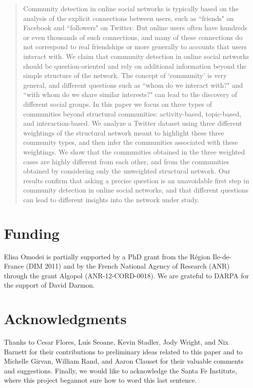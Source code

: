 \documentclass{article}
\newcommand{\alert}[1]{{\color{red}#1}}
\begin{document}
\begin{abstract}


Community detection in online social networks is typically based on the analysis of the explicit connections between users, such as ``friends" on Facebook and ``followers" on Twitter. But online users often have hundreds or even thousands of such connections, and many of these connections do not correspond to real friendships or more generally to accounts that users interact with. We claim that community detection in online social networks should be question-oriented and rely on additional information beyond the simple structure of the network. The concept of `community' is very general, and different questions such as ``whom do we interact with?" and ``with whom do we share similar interests?" can lead to the discovery of different social groups. In this paper we focus on three types of communities beyond structural communities: activity-based, topic-based, and interaction-based. We analyze a Twitter dataset using three different weightings of the structural network meant to highlight these three community types, and then infer the communities associated with these weightings. We show that the communities obtained in the three weighted cases are highly different from each other, and from the communities obtained by considering only the unweighted structural network. Our results confirm that asking a precise question is an unavoidable first step in community detection in online social networks, and that different questions can lead to different insights into the network under study.
\end{abstract}

\newpage






\section{Funding}
Elisa Omodei is partially supported by a PhD grant from the Région Ile-de-France (DIM 2011) and by the French National Agency of Research (ANR) through the grant Algopol (ANR-12-CORD-0018).
We are grateful to DARPA for the support of David Darmon.
\section{Acknowledgments}

Thanks to Cesar Flores, Lu\'is Seoane, Kevin Stadler, Jody Wright, and Nix Barnett for their contributions to preliminary ideas related to this paper and to Michelle Girvan, William Rand, and Aaron Clauset for their valuable comments and suggestions. Finally, we would like to acknowledge the Santa Fe Institute, where this project began\alert{not sure how to word this last sentence}.





%



% 
\end{document}
